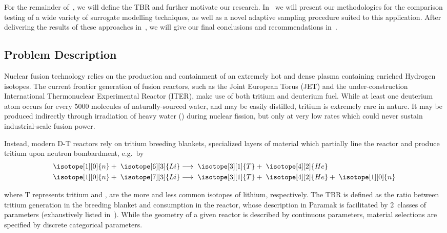 For the remainder of~, we will define the TBR and further motivate our
research. In~ we will present our methodologies for the comparison
testing of a wide variety of surrogate modelling techniques, as well as a novel
adaptive sampling procedure suited to this application. After delivering the
results of these approaches in~, we will give our final conclusions and
recommendations in~.


\subsection{Problem Description}
\label{sec:problemdescription}

Nuclear fusion technology relies on the production and containment of an
extremely hot and dense plasma containing enriched Hydrogen isotopes. The current frontier generation of fusion reactors, such as the Joint European Torus (JET) and the
under-construction International Thermonuclear Experimental Reactor (ITER), make
use of both tritium and deuterium fuel. While at least one deuterium atom occurs for every \num{5000} molecules of naturally-sourced water, and may be easily distilled, tritium is extremely rare in nature. It may be produced indirectly through irradiation of heavy water
(\DDO) during nuclear fission, but only at very low rates which could
never sustain industrial-scale fusion power.

Instead, modern D-T reactors rely on tritium breeding blankets, specialized
layers of material which partially line the reactor and produce tritium upon
neutron bombardment, e.g.~by 
\begin{eqnarray}
	\isotope[1][0]{n} + \hspace{3pt} \isotope[6][3]{Li} 
	&\longrightarrow \hspace{3pt} 
	\isotope[3][1]{T} + \hspace{3pt}\isotope[4][2]{He} \\
	\isotope[1][0]{n} + \hspace{3pt} \isotope[7][3]{Li} 
	&\longrightarrow \hspace{3pt} 
	\isotope[3][1]{T} + \hspace{3pt} \isotope[4][2]{He} + \hspace{3pt} \isotope[1][0]{n}
\end{eqnarray}

where T represents tritium and ,  are the more and
less common isotopes of lithium, respectively. The TBR is defined as the ratio
between tritium generation in the breeding blanket and consumption in the
reactor, whose description in Paramak is facilitated by 2~classes of parameters
(exhaustively listed in~). While the geometry of a given
reactor is described by continuous parameters, material selections are specified
by discrete categorical parameters.

